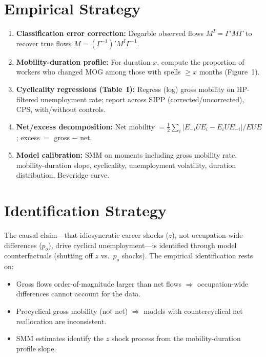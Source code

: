 \section{Empirical Strategy}

\begin{enumerate}
  \item \textbf{Classification error correction:} Degarble observed flows
    $M^I=\Gamma'M\Gamma$ to recover true flows $M=(\Gamma^{-1})'M^I\Gamma^{-1}$.
  \item \textbf{Mobility-duration profile:} For duration $x$, compute the
    proportion of workers who changed MOG among those with spells $\geq x$
    months (Figure~1).
  \item \textbf{Cyclicality regressions (Table~I):} Regress (log) gross
    mobility on HP-filtered unemployment rate; report across SIPP
    (corrected/uncorrected), CPS, with/without controls.
  \item \textbf{Net/excess decomposition:} Net mobility
    $= \tfrac{1}{2}\sum_i|E_{-i}UE_i - E_iUE_{-i}|/EUE$; excess
    $=$ gross $-$ net.
  \item \textbf{Model calibration:} SMM on moments including gross mobility
    rate, mobility-duration slope, cyclicality, unemployment volatility,
    duration distribution, Beveridge curve.
\end{enumerate}

\section{Identification Strategy}

The causal claim---that idiosyncratic career shocks ($z$), not occupation-wide
differences ($p_o$), drive cyclical unemployment---is identified through model
counterfactuals (shutting off $z$ vs.\ $p_o$ shocks). The empirical
identification rests on:
\begin{itemize}
  \item Gross flows order-of-magnitude larger than net flows $\Rightarrow$
    occupation-wide differences cannot account for the data.
  \item Procyclical gross mobility (not net) $\Rightarrow$ models with
    countercyclical net reallocation are inconsistent.
  \item SMM estimates identify the $z$ shock process from the
    mobility-duration profile slope.
\end{itemize}

